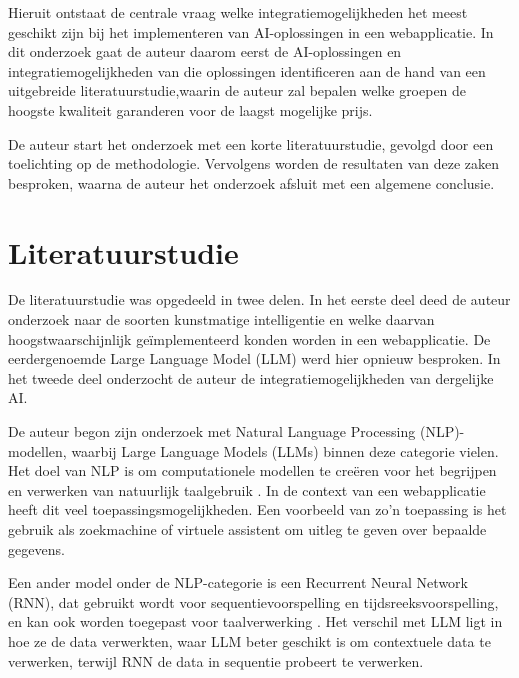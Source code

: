 \documentclass[dutch]{hogent-article}
\begin{document}
  Hieruit ontstaat de centrale vraag welke integratiemogelijkheden het meest geschikt zijn bij het implementeren van AI-oplossingen in een webapplicatie. In dit onderzoek gaat de auteur daarom eerst de AI-oplossingen en integratiemogelijkheden van die oplossingen identificeren aan de hand van een uitgebreide literatuurstudie,\linebreak waarin de auteur zal bepalen welke groepen de hoogste kwaliteit garanderen voor de laagst mogelijke prijs.
  
  De auteur start het onderzoek met een korte literatuurstudie, gevolgd door een toelichting op de methodologie. Vervolgens worden de resultaten van deze zaken besproken, waarna de auteur het onderzoek afsluit met een algemene conclusie.
  

\section{Literatuurstudie}%
\label{sec:literature review}


De literatuurstudie was opgedeeld in twee delen. In het eerste deel deed de auteur onderzoek naar de soorten kunstmatige intelligentie en welke daarvan hoogstwaarschijnlijk geïmplementeerd konden worden in een webapplicatie. De eerdergenoemde Large Language Model (LLM) werd hier opnieuw besproken. In het tweede deel onderzocht de auteur de integratiemogelijkheden van dergelijke AI.

De auteur begon zijn onderzoek met Natural Language Processing (NLP)-modellen, waarbij Large Language Models (LLMs) binnen deze categorie vielen. Het doel van NLP is om computationele modellen te creëren voor het begrijpen en verwerken van natuurlijk taalgebruik \autocite{Bharati2002}. In de context van een webapplicatie heeft dit veel toepassingsmogelijkheden. Een voorbeeld van zo'n toepassing is het gebruik als zoekmachine of virtuele assistent om uitleg te geven over bepaalde gegevens.

Een ander model onder de NLP-categorie is een Recurrent Neural Network (RNN), dat gebruikt wordt voor sequentievoorspelling en tijdsreeksvoorspelling, en kan ook worden toegepast voor taalverwerking \autocite{IBMRNN2023}. Het verschil met LLM ligt in hoe ze de data verwerkten, waar LLM beter geschikt is om contextuele data te verwerken, terwijl RNN de data in sequentie probeert te verwerken.
\end{document}
